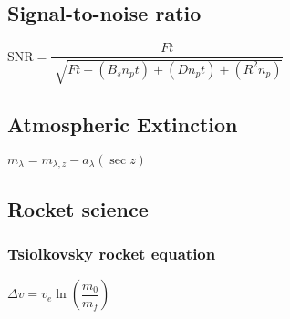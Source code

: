 \subsection{Signal-to-noise ratio}
\begin{itemize}
\itemt \( \mathrm{SNR} = \dfrac{Ft}{\sqrt[]{Ft + (B_s n_p t) + (D n_p t) + (R^2 n_p)}} \)
\end{itemize}

\subsection{Atmospheric Extinction}
\begin{itemize}
\itemt \( m_{\lambda} = m_{\lambda,z} - a_\lambda (\sec z) \)
\end{itemize}


\subsection{Rocket science}

\subsubsection{Tsiolkovsky rocket equation}
\begin{itemize}
\itemt \( \Delta v = v_e \ln(\dfrac{m_0}{m_f}) \)
\end{itemize}
